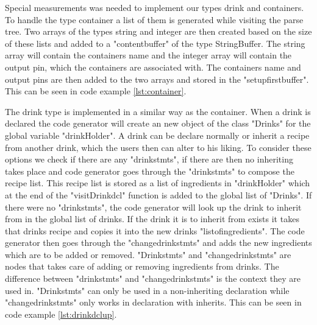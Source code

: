 
Special measurements was needed to implement our types drink and containers. To handle the type container a list of them is generated while visiting the parse tree. Two arrays of the types string and integer are then created based on the size of these lists and added to a "contentbuffer" of the type StringBuffer. The string array will contain the containers name and the integer array will contain the output pin, which the containers are associated with. The containers name and output pins are then added to the two arrays and stored in the "setupfirstbuffer". This can be seen in code example \ref{lst:container}.


The drink type is implemented in a similar way as the container. When a drink is declared the code generator will create an new object of the class "Drinks" for the global variable "drinkHolder". A drink can be declare normally or inherit a recipe from another drink, which the users then can alter to his liking. To consider these options we check if there are any "drinkstmts", if there are then no inheriting takes place and code generator goes through the "drinkstmts" to compose the recipe list. This recipe list is stored as a list of ingredients in "drinkHolder" which at the end of the "visitDrinkdcl" function is added to the global list of "Drinks". If there were no "drinkstmts", the code generator will look up the drink to inherit from in the global list of drinks. If the drink it is to inherit from exists it takes that drinks recipe and copies it into the new drinks "listofingredients". The code generator then goes through the "changedrinkstmts" and adds the new ingredients which are to be added or removed. "Drinkstmts" and "changedrinkstmts" are nodes that takes care of adding or removing ingredients from drinks. The difference between "drinkstmts" and "changedrinkstmts" is the context they are used in. "Drinkstmts" can only be used in a non-inheriting declaration while "changedrinkstmts" only works in declaration with inherits. This can be seen in code example \ref{lst:drinkdclup}.



